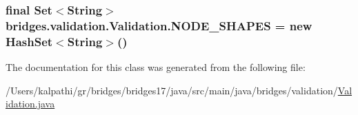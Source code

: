 \subsubsection[{N\+O\+D\+E\+\_\+\+S\+H\+A\+P\+E\+S}]{\setlength{\rightskip}{0pt plus 5cm}final Set$<$String$>$ bridges.\+validation.\+Validation.\+N\+O\+D\+E\+\_\+\+S\+H\+A\+P\+E\+S = new Hash\+Set$<$String$>$()\hspace{0.3cm}{\ttfamily [static]}}\label{classbridges_1_1validation_1_1_validation_a43f1f9efc20d0086b7fcfa9b40bd7146}


The documentation for this class was generated from the following file\+:\begin{DoxyCompactItemize}
\item 
/\+Users/kalpathi/gr/bridges/bridges17/java/src/main/java/bridges/validation/\hyperlink{_validation_8java}{Validation.\+java}\end{DoxyCompactItemize}
